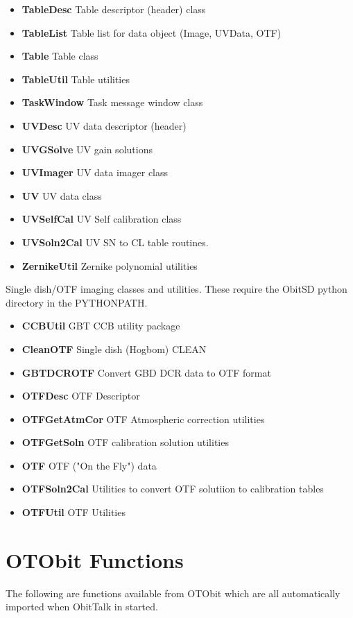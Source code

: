 \documentclass[11pt]{report}
\begin{document}
\begin{itemize}
\item {\bf TableDesc}      Table descriptor (header) class
\item {\bf TableList}      Table list for data object (Image, UVData, OTF)
\item {\bf Table }         Table class
\item {\bf TableUtil}      Table utilities
\item {\bf TaskWindow}     Task message window class
\item {\bf UVDesc}         UV data descriptor (header)
\item {\bf UVGSolve}       UV gain solutions
\item {\bf UVImager}       UV data imager class
\item {\bf UV }            UV data class
\item {\bf UVSelfCal}      UV Self calibration class
\item {\bf UVSoln2Cal}     UV SN to CL table routines.
\item {\bf ZernikeUtil}    Zernike polynomial utilities
\end{itemize}

Single dish/OTF imaging classes and utilities.
These require the ObitSD python directory in the PYTHONPATH.
\begin{itemize}
\item {\bf CCBUtil}        GBT CCB utility package
\item {\bf CleanOTF}       Single dish (Hogbom) CLEAN
\item {\bf GBTDCROTF}      Convert GBD DCR data to OTF format
\item {\bf OTFDesc}        OTF Descriptor
\item {\bf OTFGetAtmCor}   OTF Atmospheric correction utilities
\item {\bf OTFGetSoln}     OTF calibration solution utilities
\item {\bf OTF}            OTF ("On the Fly") data
\item {\bf OTFSoln2Cal}    Utilities to convert OTF solutiion to calibration tables
\item {\bf OTFUtil}        OTF Utilities
\end{itemize}

\section {OTObit Functions}
The following are functions available from OTObit which are all
automatically imported when ObitTalk in started.
\end{document}
